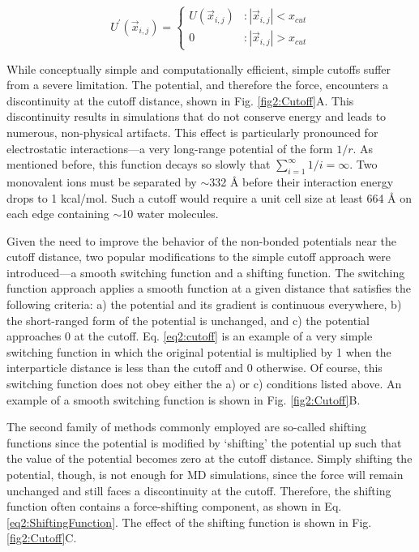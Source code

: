\begin{equation}
   U^{\prime}(\vec{x}_{i,j}) = \left \{
   \begin{array}{lr}
      U(\vec{x}_{i,j}) & : \left | \vec{x}_{i,j} \right | < x_{cut} \\
      0 & : \left | \vec{x}_{i,j} \right | > x_{cut}
   \end{array}
   \right.
   \label{eq2:cutoff}
\end{equation}

While conceptually simple and computationally efficient, simple cutoffs suffer
from a severe limitation. The potential, and therefore the force, encounters a
discontinuity at the cutoff distance, shown in Fig.
\ref{fig2:Cutoff}A. This discontinuity results in simulations that do not
conserve energy and leads to numerous, non-physical artifacts.
\cite{Schreiber_JMolBiol_1992_v228_p909, Schreiber_Biochemistry_1992_v31_p5856,
Saito_JChemPhys_1994_v101_p4055, Auffinger_ChemPhysLett_1995_v234_p413,
Cheatham_JAmChemSoc_1995_v117_p4193, Feller_JPhysChem_1996_v100_p17011,
Patra_BiophysJ_2003_v84_p3636} This effect is particularly pronounced for
electrostatic interactions---a very long-range potential of the form $1/r$. As
mentioned before, this function decays so slowly that $\sum_{i=1}^{\infty} 1/i =
\infty$.  Two monovalent ions must be separated by $\sim$332 {\AA} before their
interaction energy drops to 1 kcal/mol. Such a cutoff would require a unit cell
size at least 664 {\AA} on each edge containing $\sim$10 water
molecules.

Given the need to improve the behavior of the non-bonded potentials near the
cutoff distance, two popular modifications to the simple cutoff approach were
introduced---a smooth switching function and a shifting function. The switching
function approach applies a smooth function at a given distance that satisfies
the following criteria: a) the potential and its gradient is continuous
everywhere, b) the short-ranged form of the potential is unchanged, and c) the
potential approaches 0 at the cutoff. Eq. \ref{eq2:cutoff} is an example of a
very simple switching function in which the original potential is multiplied by
1 when the interparticle distance is less than the cutoff and 0 otherwise. Of
course, this switching function does not obey either the a) or c) conditions
listed above. An example of a smooth switching function is shown in Fig.
\ref{fig2:Cutoff}B. \cite{Steinbach_JComputChem_1994_v15_p667}

The second family of methods commonly employed are so-called shifting functions
since the potential is modified by `shifting' the potential up such that the
value of the potential becomes zero at the cutoff distance.
\cite{Steinbach_JComputChem_1994_v15_p667, Allen_Tildesley} Simply shifting the
potential, though, is not enough for MD simulations, since the force will remain
unchanged and still faces a discontinuity at the cutoff. Therefore, the shifting
function often contains a force-shifting component, as shown in Eq.
\ref{eq2:ShiftingFunction}. \cite{Allen_Tildesley} The effect of the shifting
function is shown in Fig. \ref{fig2:Cutoff}C.

